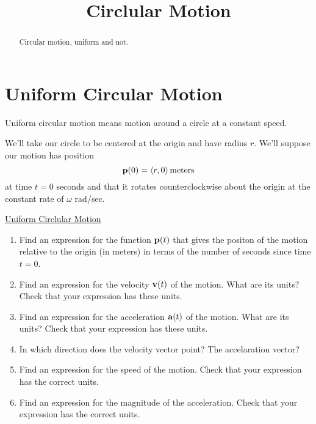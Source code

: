 \documentclass{ximera}
\title{Circlular Motion}
\begin{document}
\begin{abstract}
Circular motion, uniform and not.
\end{abstract}
\maketitle

\section{Uniform Circular Motion}
\begin{question}  \label{Q34trgr5t5t344}
Uniform circular motion means motion around a circle at a constant speed.

We'll take our circle to be centered at the origin and have radius $r$. We'll suppose our motion has position 
\[
     {\bf p}(0) = \langle r, 0 \rangle \, \text{meters}
\]
at time $t=0$ seconds and that it rotates counterclockwise about the origin at the constant rate of $\omega$ rad/sec.

\begin{onlineOnly}
    \begin{center}
\end{center}
\end{onlineOnly}

\href{https://www.geogebra.org/classic/uu2jshcp}{Uniform Circlular Motion}

\begin{enumerate}
\item Find an expression for the function ${\bf p}(t)$ that gives the positon of the motion relative to the origin (in meters) in terms of the number of seconds since time $t=0$.

\item Find an expression for the velocity ${\bf v}(t)$ of the motion. What are its units? Check that your expression has these units.

\item Find an expression for the acceleration ${\bf a}(t)$ of the motion. What are its units? Check that your expression has these units.

\item In which direction does the velocity vector point? The accelaration vector?

\item Find an expression for the speed of the motion. Check that your expression has the correct units.

\item Find an expression for the magnitude of the acceleration. Check that your expression has the correct units.


\end{enumerate}
\end{question}
\end{document}
